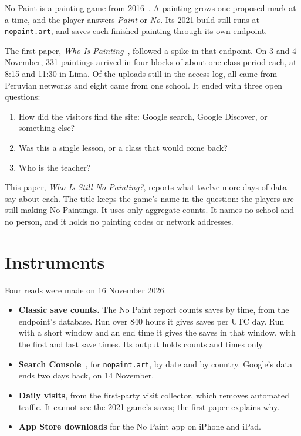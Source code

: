\documentclass[10pt,letterpaper,twocolumn]{article}
\begin{document}
No Paint is a painting game from 2016~\cite{scudder2016nopaint}. A painting grows one proposed mark at a time, and the player answers \emph{Paint} or \emph{No}. Its 2021 build still runs at \texttt{nopaint.art}, and saves each finished painting through its own endpoint.

The first paper, \emph{Who Is Painting}~\cite{scudder2026whoispainting}, followed a spike in that endpoint. On 3 and 4 November, 331 paintings arrived in four blocks of about one class period each, at 8:15 and 11:30 in Lima. Of the uploads still in the access log, all came from Peruvian networks and eight came from one school. It ended with three open questions:

\begin{enumerate}
\item How did the visitors find the site: Google search, Google Discover, or something else?
\item Was this a single lesson, or a class that would come back?
\item Who is the teacher?
\end{enumerate}

This paper, \emph{Who Is Still No Painting?}, reports what twelve more days of data say about each. The title keeps the game's name in the question: the players are still making No Paintings. It uses only aggregate counts. It names no school and no person, and it holds no painting codes or network addresses.

\section{Instruments}

Four reads were made on 16 November 2026.

\begin{itemize}
\item \textbf{Classic save counts.} The No Paint report counts saves by time, from the endpoint's database. Run over 840 hours it gives saves per UTC day. Run with a short window and an end time it gives the saves in that window, with the first and last save times. Its output holds counts and times only.
\item \textbf{Search Console}~\cite{google2026performance}, for \texttt{nopaint.art}, by date and by country. Google's data ends two days back, on 14 November.
\item \textbf{Daily visits}, from the first-party visit collector, which removes automated traffic. It cannot see the 2021 game's saves; the first paper explains why.
\item \textbf{App Store downloads} for the No Paint app on iPhone and iPad.
\end{itemize}
\end{document}
